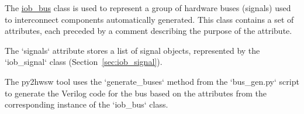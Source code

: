 %

%
%

The \href{https://github.com/IObundle/py2hwsw/blob/main/py2hwsw/scripts/iob_bus.py}{iob\_bus} class is used to represent a group of hardware buses (signals) used to interconnect components automatically generated.
This class contains a set of attributes, each preceded by a comment describing the purpose of the attribute.


The `signals` attribute stores a list of signal objects, represented by the `iob\_signal` class (Section~\ref{sec:iob_signal}).

%
%

The py2hwsw tool uses the `generate\_buses` method from the `bus\_gen.py` script to generate the Verilog code for the bus based on the attributes from the corresponding instance of the `iob\_bus` class.

